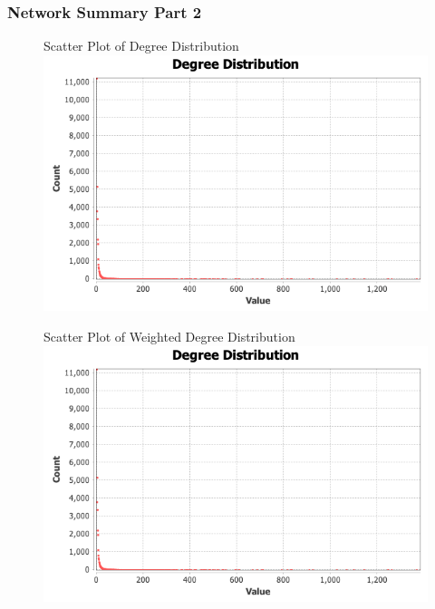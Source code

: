 \documentclass{beamer}
\begin{document}
\begin{frame}
\frametitle{Network Summary Part 2}
	\begin{multicols}{2}
		\begin{figure}
	        {\tiny Scatter Plot of Degree Distribution}
		\includegraphics[width=\columnwidth]{degree-distribution.png}
		\end{figure}
		\columnbreak
		\begin{figure}
		{\tiny Scatter Plot of  Weighted Degree Distribution}
		\includegraphics[width=\columnwidth]{w-degree-distribution.png}
		\end{figure}
	\end{multicols}
\end{frame}
\end{document}
